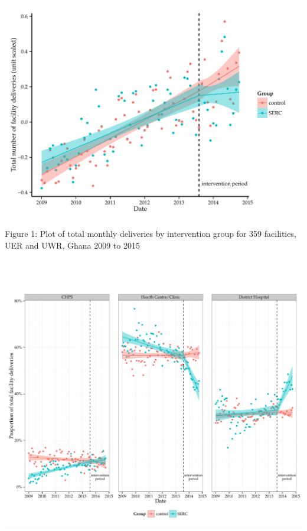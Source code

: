 \documentclass[10pt]{article}
\newenvironment{CodeChunk}{}{}
\begin{document}
\begin{CodeChunk}

\includegraphics{model_description_files/figure-latex/unnamed-chunk-2-1} \end{CodeChunk}

Figure 1: Plot of total monthly deliveries by intervention group for 359
facilities, UER and UWR, Ghana 2009 to 2015

\begin{CodeChunk}


\begin{center}\includegraphics[width=6.5in,height=5.2in]{model_description_files/figure-latex/unnamed-chunk-3-1} \end{center}

\end{CodeChunk}
\end{document}

